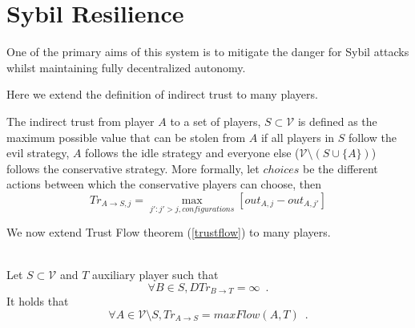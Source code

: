 \documentclass[11pt]{llncs}
\theoremstyle{definition}
\begin{document}
  \section{Sybil Resilience}
     One of the primary aims of this system is to mitigate the danger for Sybil attacks \cite{sybilattack} whilst maintaining
     fully decentralized autonomy.

     Here we extend the definition of indirect trust to many players.
     \begin{definition}
        The indirect trust from player $A$ to a set of players, $S \subset \mathcal{V}$ is defined as the maximum possible
        value that can be stolen from $A$ if all players in $S$ follow the evil strategy, $A$ follows the idle strategy and
        everyone else ($\mathcal{V} \setminus \left(S \cup \{A\}\right)$) follows the conservative strategy.
        More formally, let $choices$ be the different actions between which the conservative players can choose, then
        \begin{equation}
           Tr_{A \rightarrow S, j} = \max\limits_{j' : j' > j, configurations}{\left[out_{A,j} - out_{A,j'}\right]}
        \end{equation}
     \end{definition}
     We now extend Trust Flow theorem (\ref{trustflow}) to many players.
     \begin{theorem} \ \\
        \label{trustmany}
        Let $S \subset \mathcal{V}$ and $T$ auxiliary player such that
        \begin{equation*}
           \forall B \in S, DTr_{B \rightarrow T} = \infty \enspace.
        \end{equation*}
        It holds that
        \begin{equation*}
           \forall A \in \mathcal{V} \setminus S, Tr_{A \rightarrow S} = maxFlow\left(A, T\right) \enspace.
        \end{equation*}
     \end{theorem}       
\end{document}

